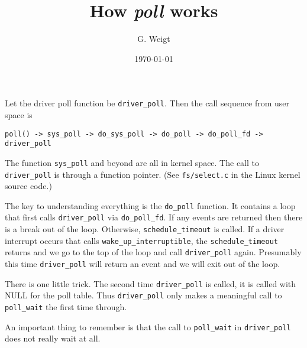 \documentclass{article}
\title{How {\it poll} works}
\author{G. Weigt}
\date{\today}
\begin{document}
\maketitle

Let the driver poll function be \verb$driver_poll$.
Then the call sequence from user space is
\begin{verbatim}
poll() -> sys_poll -> do_sys_poll -> do_poll -> do_poll_fd -> driver_poll
\end{verbatim}
The function \verb$sys_poll$ and beyond are all in kernel space.
The call to \verb$driver_poll$ is through a function pointer.
(See \verb$fs/select.c$ in the Linux kernel source code.)

The key to understanding everything is the \verb$do_poll$ function.
It contains a loop that first calls \verb$driver_poll$ via \verb$do_poll_fd$.
If any events are returned then there is a break out of the loop.
Otherwise, \verb$schedule_timeout$ is called.
If a driver interrupt occurs that calls \verb$wake_up_interruptible$,
the \verb$schedule_timeout$ returns and we go to the top of the loop and
call \verb$driver_poll$ again.
Presumably this time \verb$driver_poll$ will return an event and we will exit
out of the loop.

There is one little trick.
The second time \verb$driver_poll$ is called, it is called with NULL for
the poll table.
Thus \verb$driver_poll$ only makes a meaningful call to \verb$poll_wait$ the
first time through.

An important thing to remember is that the call to \verb$poll_wait$ in
\verb$driver_poll$ does not really wait at all.

\newpage
\end{document}
